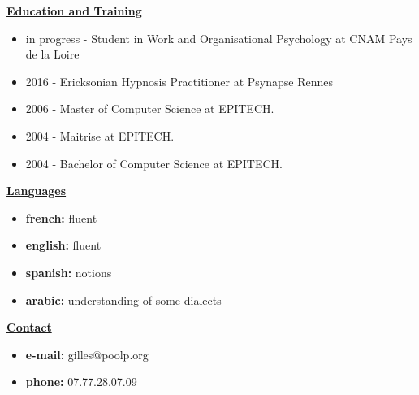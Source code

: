 \documentclass[a4paper,10pt]{letter}
\begin{document}
\underline{\textbf{Education and Training}}\\
\begin{itemize}
\item in progress - Student in Work and Organisational Psychology at CNAM Pays de la Loire
\item 2016 - Ericksonian Hypnosis Practitioner at Psynapse Rennes
\item 2006 - Master of Computer Science at {EPITECH.}
\item 2004 - Maitrise at {EPITECH.}
\item 2004 - Bachelor of Computer Science at {EPITECH.}\\
\end{itemize}

\underline{\textbf{Languages}}\\
\begin{itemize}
\item	\textbf{french:}  fluent
\item	\textbf{english:} fluent
\item	\textbf{spanish:} notions
\item	\textbf{arabic:}  understanding of some dialects\\
\end{itemize}

\underline{\textbf{Contact}}\\
\begin{itemize}
\item	\textbf{e-mail:}	gilles@poolp.org
\item	\textbf{phone:}	07.77.28.07.09
\end{itemize}

\pagebreak
\end{document}
